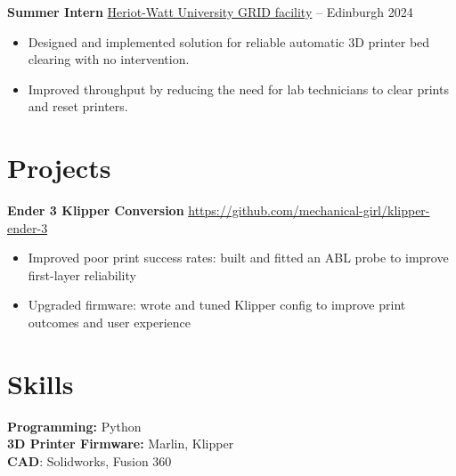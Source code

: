 \documentclass[10pt,a4paper]{article}
\begin{document}
\textbf{Summer Intern} \href{https://www.hw.ac.uk/uk/edinburgh/grid.htm}{Heriot-Watt University GRID facility} -- Edinburgh \hfill 2024 \\
\begin{itemize}
	\item Designed and implemented solution for reliable automatic 3D printer bed clearing with no intervention.
	\item Improved throughput by reducing the need for lab technicians to clear prints and reset printers.
\end{itemize}

\vspace{-18.5pt}

\section*{Projects}
\textbf{Ender 3 Klipper Conversion} \hfill \href{http://github.com/mechanical-girl/klipper-ender-3}{https://github.com/mechanical-girl/klipper-ender-3} \\
\vspace{-9pt}
\begin{itemize}
	\item Improved poor print success rates: built and fitted an ABL probe to improve first-layer reliability
	\item Upgraded firmware: wrote and tuned Klipper config to improve print outcomes and user experience
\end{itemize}
\section*{Skills}
\textbf{Programming:} Python \\
\textbf{3D Printer Firmware:} Marlin, Klipper \\
\textbf{CAD}: Solidworks, Fusion 360 \\

\vspace{-6.5pt}
\end{document}
